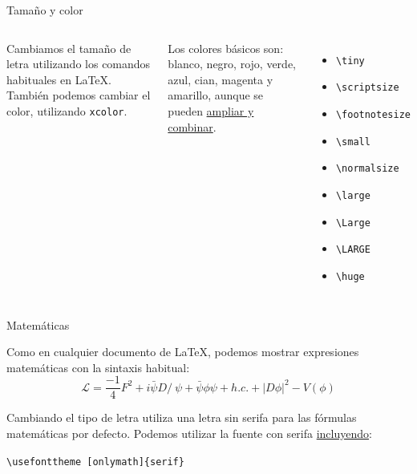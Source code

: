 \begin{frame}{Tamaño y color}
\begin{columns}
    Cambiamos el tamaño de letra utilizando los comandos habituales en \LaTeX.
    También podemos cambiar el color, utilizando \texttt{xcolor}.

    \espacio

    Los colores básicos son: {\color{white} blanco}, {\color{black} negro},
    {\color{red} rojo}, {\color{green} verde}, {\color{blue} azul},
    {\color{cyan} cian}, {\color{magenta} magenta} y {\color{yellow} amarillo},
    aunque se pueden \href{http://en.wikibooks.org/wiki/LaTeX/Colors}{ampliar y combinar}.
    \espacio

    \begin{itemize}
      \item \texttt{\tiny \textbackslash tiny}
      \item \texttt{\scriptsize \textbackslash scriptsize}
      \item \texttt{\footnotesize \textbackslash footnotesize}
      \item \texttt{\small \textbackslash small}
      \item \texttt{\normalsize \textbackslash normalsize}
      \item \texttt{\large \textbackslash large}
      \item \texttt{\Large \textbackslash Large}
      \item \texttt{\LARGE \textbackslash LARGE}
      \item \texttt{\huge \textbackslash huge}
    \end{itemize}
\end{columns}
\end{frame}

\begin{frame}{Matemáticas}

Como en cualquier documento de \LaTeX, podemos mostrar expresiones matemáticas
con la sintaxis habitual:
  \begin{equation}
    \mathcal{L} = \frac{-1}{4} F^2  + i\bar{\psi}D\!\!\!\!/\ \psi
  + \bar{\psi}\phi\psi  + h.c.  + |D\phi|^2 - V (\phi)
  \end{equation}

\pause
\begin{alertblock}{Cambiando el tipo de letra}
  \beamer utiliza una letra sin serifa para las fórmulas matemáticas por defecto.
  Podemos utilizar la fuente con serifa
  \href{http://tex.stackexchange.com/questions/34265}{incluyendo}:

  \texttt{{\color{black}\textbackslash}{\color{keywords}usefonttheme}{\color{black} [onlymath]\{serif\}}}
\end{alertblock}
\end{frame}
